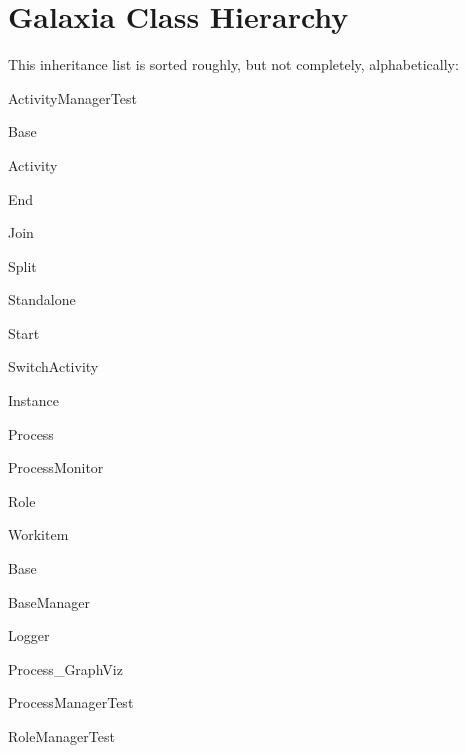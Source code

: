 \section{Galaxia Class Hierarchy}
This inheritance list is sorted roughly, but not completely, alphabetically:\begin{CompactList}
\item Activity\-Manager\-Test\item {}
\begin{CompactList}
\item Base\begin{CompactList}
\item {}
\begin{CompactList}
\item Activity\item End\item Join\item Split\item Standalone\item Start\item Switch\-Activity\end{CompactList}
\item Instance\item Process\item Process\-Monitor\item Role\item Workitem\end{CompactList}
\item Base\item Base\-Manager\begin{CompactList}
\item {}
\item {}
\item {}
\end{CompactList}
\end{CompactList}
\item {}
\begin{CompactList}
\item Logger\end{CompactList}
\item Process\_\-Graph\-Viz\item Process\-Manager\-Test\item Role\-Manager\-Test\end{CompactList}
